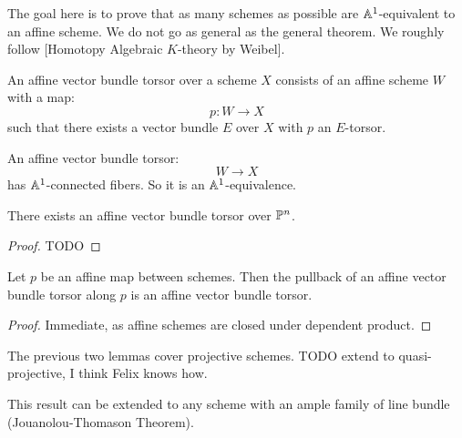 The goal here is to prove that as many schemes as possible are $\mathbb{A}^1$-equivalent to an affine scheme. We do not go as general as the general theorem. We roughly follow [Homotopy Algebraic $K$-theory by Weibel].

\begin{definition}
An affine vector bundle torsor over a scheme $X$ consists of an affine scheme $W$ with a map:
\[p:W\to X\]
such that there exists a vector bundle $E$ over $X$ with $p$ an $E$-torsor.
\end{definition}

\begin{remark}\label{vector-torsor-equivalence}
An affine vector bundle torsor:
\[W\to X\]
 has $\mathbb{A}^1$-connected fibers. So it is an $\mathbb{A}^1$-equivalence.
\end{remark}

\begin{lemma}
There exists an affine vector bundle torsor over $\mathbb{P}^n$.
\end{lemma}

\begin{proof}
TODO
\end{proof}

\begin{lemma}
Let $p$ be an affine map between schemes. Then the pullback of an affine vector bundle torsor along $p$ is an affine vector bundle torsor.
\end{lemma}

\begin{proof}
Immediate, as affine schemes are closed under dependent product.
\end{proof}

The previous two lemmas cover projective schemes. TODO extend to quasi-projective, I think Felix knows how.

\begin{remark}
This result can be extended to any scheme with an ample family of line bundle (Jouanolou-Thomason Theorem).
\end{remark}


